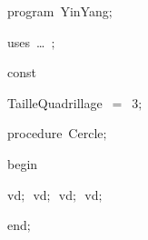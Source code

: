 
{
\parindent {}
\medskip

\carrenoir
\vspace{\neglskip}\mbox{\blc  \idt  \mcl program\idt\ YinYang$;$
}\par 
\vspace{\neglskip}\mbox{\blc \blk\idt \mcl uses\idt \ \ldots\ $;$
}\par 
\medskip

\pagebreak[3] 
\vspace{\neglskip}\mbox{\blc  \blk\idt  \mcl const\idt }\par 
\vspace{\neglskip}\mbox{\blc  \blk\blk\idt  TailleQuadrillage\ $=$\ 3$;$}\par 
\medskip

\pagebreak[3] 
\vspace{\neglskip}\mbox{\blc  \blk\idt  \mcl procedure\idt \ Cercle$;$}\par 
\vspace{\neglskip}\mbox{\blc  \blk\idt  \mcl begin\idt }\par 
\vspace{\neglskip}\mbox{\blc  \blk\blk\idt  vd$;$\ vd$;$\ vd$;$\ vd$;$}\par 
\vspace{\neglskip}\mbox{\blc  \blk\idt  \mcl end\idt $;$}\par 
\medskip

}
